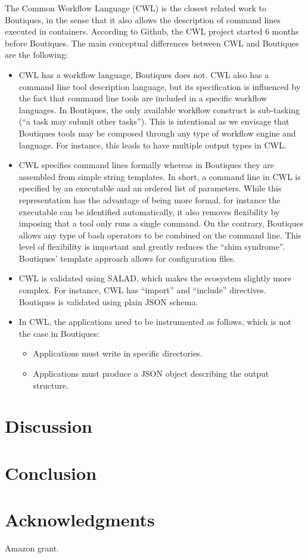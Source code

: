 \documentclass{article}
\newcommand{\todo}[2]{\pdfmargincomment[color=red,author=#1,open=true]{#2}}
\begin{document}
The Common Workflow Language (CWL) is the closest related work to
Boutiques, in the sense that it also allows the description of command
lines executed in containers. According to Github, the CWL project
started 6 months before Boutiques. The main conceptual differences
between CWL and Boutiques are the following:
\begin{itemize}
\item CWL has a workflow language, Boutiques does not. CWL also has a
  command line tool description language, but its specification is
  influenced by the fact that command line tools are included in a
  specific workflow languages. In Boutiques, the only available
  workflow construct is sub-tasking (``a task may submit other
  tasks''). This is intentional as we envisage that Boutiques tools
  may be composed through any type of workflow engine and language. For instance, this leads to have multiple output types in CWL.
\item CWL specifies command lines formally whereas in Boutiques they
  are assembled from simple string templates. In short, a command line
  in CWL is specified by an executable and an ordered list of
  parameters. While this representation has the advantage of being
  more formal, for instance the executable can be identified
  automatically, it also removes flexibility by imposing that a tool
  only runs a single command. On the contrary, Boutiques allows any
  type of bash operators to be combined on the command line. This
  level of flexibility is important and greatly reduces the ``shim
  syndrome''. Boutiques' template approach allows for configuration files. 
\item CWL is validated using SALAD, which makes the ecosystem slightly
  more complex. For instance, CWL has ``import'' and ``include''
  directives. Boutiques is validated using plain JSON schema. \todo{ontology layer}.
\item In CWL, the applications need to be instrumented as follows, which is not the case in Boutiques:
\begin{itemize}
\item Applications must write in specific directories.
\item Applications must produce a JSON object describing the output structure.
\end{itemize}
\end{itemize}

\todo{Tristan}{Update from comparison summary on Google doc}

\section{Discussion}


\section{Conclusion}

\section{Acknowledgments}

Amazon grant.



\end{document}
